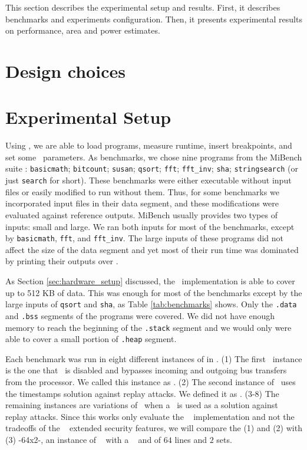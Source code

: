 

This section describes the experimental setup and results. First, it describes benchmarks and experiments configuration. Then, it presents experimental results on performance, area and power estimates.

\section{Design choices}


\section{Experimental Setup}
\label{subsec:Experimental-Setup}

Using \grmon, we are able to load programs, measure runtime, insert breakpoints, and set some \leon~parameters. As benchmarks, we chose nine programs from the MiBench suite \cite{MiBench}: \texttt{basicmath}; \texttt{bitcount}; \texttt{susan}; \texttt{qsort}; \texttt{fft}; \texttt{fft\_inv}; \texttt{sha}; \texttt{stringsearch} (or just \texttt{search} for short). These benchmarks were either executable without input files or easily modified to run without them. Thus, for some benchmarks we incorporated input files in their data segment, and these modifications were evaluated against reference outputs. MiBench usually provides two types of inputs: small and large. We ran both inputs for most of the benchmarks, except by \texttt{basicmath}, \texttt{fft}, and \texttt{fft\_inv}. The large inputs of these programs did not affect the size of the data segment and yet most of their run time was dominated by printing their outputs over \grmon.

As Section \ref{sec:hardware_setup} discussed, the \cshia~implementation is able to cover up to 512 KB of data. This was enough for most of the benchmarks except by the large inputs of \texttt{qsort} and \texttt{sha}, as Table \ref{tab:benchmarks} shows. Only the \texttt{.data} and \texttt{.bss} segments of the programs were covered. We did not have enough memory to reach the beginning of the \texttt{.stack} segment and we would only were able to cover a small portion of \texttt{.heap} segment.

Each benchmark was run in eight different instances of \cshia in \cite{caio}. (1) The first \cshia~instance is the one that \handler~is disabled and bypasses incoming and outgoing bus transfers from the processor. We called this instance as \baseline. (2) The second instance of \cshia~uses the timestamps solution against replay attacks. We defined it as \timestamp. (3-8) The remaining instances are variations of \cshia~when a \mt~is used as a solution against replay attacks. Since this works only evaluate the \cshia~ implementation and not the tradeoffs of the \cshia~ extended security features, we will compare the (1) and (2) with (3) \cshiamt-64x2-\lru , an instance of \cshia~ with a \mt~ and \ptagcache of $64$ lines and $2$ sets.

